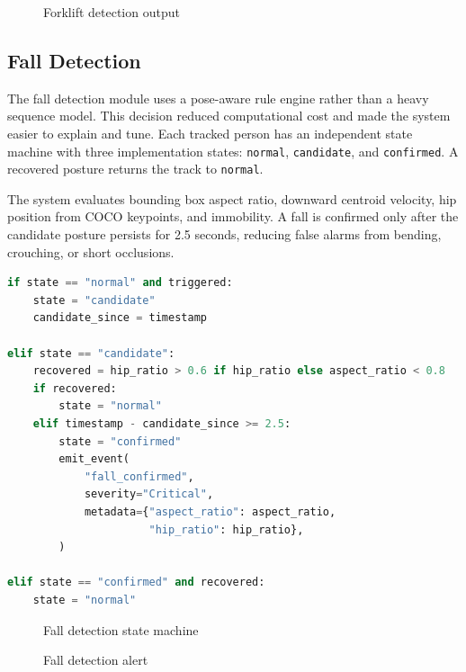 \begin{figure}[H]
\centering
{}
\caption{Forklift detection output}
\end{figure}

\subsection{Fall Detection}

The fall detection module uses a pose-aware rule engine rather than a heavy sequence model. This decision reduced computational cost and made the system easier to explain and tune. Each tracked person has an independent state machine with three implementation states: \texttt{normal}, \texttt{candidate}, and \texttt{confirmed}. A recovered posture returns the track to \texttt{normal}.

The system evaluates bounding box aspect ratio, downward centroid velocity, hip position from COCO keypoints, and immobility. A fall is confirmed only after the candidate posture persists for 2.5 seconds, reducing false alarms from bending, crouching, or short occlusions.

\begin{lstlisting}[language=Python,caption={Fall state transition logic},label={lst:fall-state}]
if state == "normal" and triggered:
    state = "candidate"
    candidate_since = timestamp

elif state == "candidate":
    recovered = hip_ratio > 0.6 if hip_ratio else aspect_ratio < 0.8
    if recovered:
        state = "normal"
    elif timestamp - candidate_since >= 2.5:
        state = "confirmed"
        emit_event(
            "fall_confirmed",
            severity="Critical",
            metadata={"aspect_ratio": aspect_ratio,
                      "hip_ratio": hip_ratio},
        )

elif state == "confirmed" and recovered:
    state = "normal"
\end{lstlisting}

\begin{figure}[H]
\centering
{}
\caption{Fall detection state machine}
\end{figure}

\begin{figure}[H]
\centering
{}
\caption{Fall detection alert}
\end{figure}

